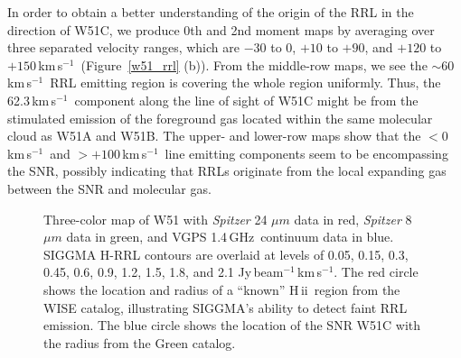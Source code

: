 \documentclass[manuscript]{aastex61}
\newcommand{\hii}{{\rm H\,}{{\sc ii}}}
\newcommand{\kms}{\,km\,s$^{-1}$}
\newcommand{\ghz}{\,GHz}
\newcommand{\um}{\mu m}
\begin{document}
In order to obtain a better understanding of the origin of the RRL in the direction of W51C, we produce 0th and 2nd moment maps by averaging over three separated velocity ranges, which are $-30$ to $0$, $+10$ to $+90$, and $+120$ to $+150$\kms\ (Figure~\ref{w51_rrl} (b)).
From the middle-row maps, we see the $\sim60$\kms\ RRL emitting region is covering the whole region uniformly. 
Thus, the 62.3\kms\ component along the line of sight of W51C might be from the stimulated emission of the foreground gas located within the same molecular cloud as W51A and W51B.
The upper- and lower-row maps show that the $<0$\kms\ and $>+100$\kms\ line emitting components seem to be encompassing the SNR, possibly indicating that RRLs originate from the local expanding gas between the SNR and molecular gas.

\begin{figure}[htbp]
\centering
{}
\caption{Three-color map of W51 
with {\it Spitzer} 24 $\um$ data in red,  {\it Spitzer} 8 $\um$ data in green, and VGPS 1.4\ghz\ continuum data in blue. 
SIGGMA H-RRL contours are overlaid at levels of 0.05, 0.15, 0.3, 0.45, 0.6, 0.9, 1.2, 1.5, 1.8, and 2.1 Jy\,beam$^{-1}$\kms. The red circle shows the location and radius of a ``known'' \hii\ region from the WISE catalog, illustrating SIGGMA's ability to detect faint RRL emission. The blue circle shows the location of the SNR W51C with the radius from the Green catalog.}\label{w51_map}
\end{figure}
\end{document}

